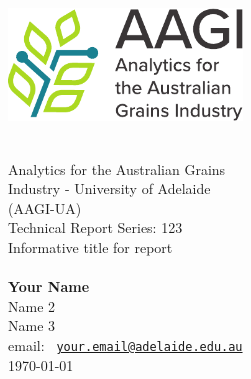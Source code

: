 \documentclass[12pt]{article}
\begin{document}
  \frontmatter

  \thispagestyle{empty}
  \vspace*{-30mm}

  \begin{center}
    \includegraphics[height=3cm]{assets/AAGI_logo.pdf}    
  \end{center}

  \vfill
  

  \begin{flushright}
    \HRule\\[5mm]

    \huge
    \textcolor{aagiblue}{\sbf Analytics for the Australian Grains\\
      Industry - University of Adelaide\\
      (AAGI-UA)\\
      Technical Report Series: 123}\\[6mm]

    {\sbf Informative title for report}\\
    \Large
    \vspace{2mm}{\sbf Report for $<$Project Number$>$}\\[5mm]

    \sf\normalsize
    \textbf{Your Name}\\
    Name 2\\
    Name 3\\
    \vspace*{0.4cm}
    email:\; \texttt{%
      \href{mailto:your.email@adelaide.edu.au}%
      {your.email@adelaide.edu.au}}\\[8mm]
      
    \today\\
    \HRule
  \end{flushright}

  \vfill

  \noindent{}
  \vspace*{-30mm}
\end{document}

